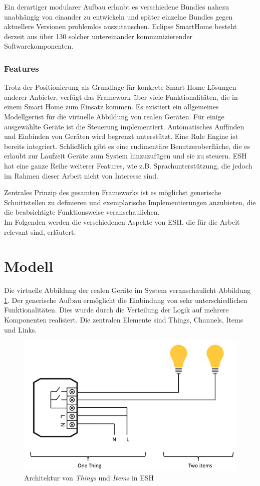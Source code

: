 Ein derartiger modularer Aufbau erlaubt es verschiedene Bundles nahezu unabhängig von einander zu entwickeln und später einzelne Bundles gegen aktuellere Versionen problemlos auszutauschen. Eclipse SmartHome besteht derzeit aus über 130 solcher untereinander kommunizierender Softwarekomponenten.


\subsubsection{Features}
Trotz der Positionierung als Grundlage für konkrete Smart Home Lösungen anderer Anbieter, verfügt das Framework über viele Funktionalitäten, die in einem Smart Home zum Einsatz kommen. Es existiert ein allgemeines Modellgerüst für die virtuelle Abbildung von realen Geräten. Für einige ausgewählte Geräte ist die Steuerung implementiert. Automatisches Auffinden und Einbinden von Geräten wird begrenzt unterstützt. Eine Rule Engine ist bereits integriert. Schließlich gibt es eine rudimentäre Benutzeroberfläche, die es erlaubt zur Laufzeit Geräte zum System hinzuzufügen und sie zu steuern. ESH hat eine ganze Reihe weiterer Features, wie z.B. Sprachunterstützung, die jedoch im Rahmen dieser Arbeit nicht von Interesse sind. 

Zentrales Prinzip des gesamten Frameworks ist es möglichst generische Schnittstellen zu definieren und exemplarische Implementierungen anzubieten, die die beabsichtigte Funktionsweise veranschaulichen. \\

Im Folgenden werden die verschiedenen Aspekte von ESH, die für die Arbeit relevant sind, erläutert.

\section{Modell}
Die virtuelle Abbildung der realen Geräte im System veranschaulicht Abbildung \ref{fig:esh_model}. Der generische Aufbau ermöglicht die Einbindung von sehr unterschiedlichen Funktionalitäten.  Dies wurde durch die Verteilung der Logik auf mehrere Komponenten realisiert. Die zentralen Elemente sind Things, Channels, Items und Links. 

\begin{figure}[h]
	\centering
	\includegraphics[width=\textwidth]{bilder/esh_model}
	\caption{Architektur von \textit{Things} und \textit{Items} in ESH \cite{ESH:home}}
	\label{fig:esh_model}
\end{figure}

